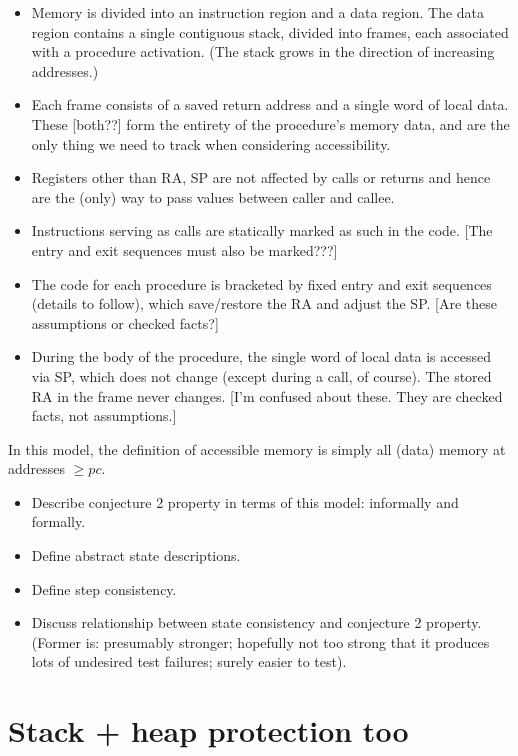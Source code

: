 \documentclass[conference]{IEEEtran}
\begin{document}
  \begin {itemize}
  \item Memory is divided into an instruction region and a data region. The data region contains a single contiguous stack, divided into frames, each associated with a procedure activation. (The stack grows in the direction of increasing addresses.)
  \item Each frame consists of a saved return address and a single word of local data. These [both??] form the entirety of the procedure's memory data, and are the only thing we need to track when considering accessibility.
  \item Registers other than RA, SP are not affected by calls or returns and hence are the (only) way to pass values between caller and callee.
  \item Instructions serving as calls are statically marked as such in the code. [The entry and exit sequences must also be marked???]
  \item The code for each procedure is bracketed by fixed entry and exit sequences (details to follow), which save/restore the RA and
    adjust the SP. [Are these assumptions or checked facts?]
  \item During the body of the procedure, the single word of local data is accessed via SP, which does not change (except during a call, of course).  The stored RA in the frame never changes. [I'm confused about these. They are checked facts, not assumptions.]
  \end {itemize}
  In this model, the definition of accessible memory is simply all (data) memory at addresses $\geq pc$.
\begin{itemize}
\item
  Describe conjecture 2 property in terms of this model: informally and formally.
\item
  Define abstract state descriptions.
\item
  Define step consistency.
\item
  Discuss relationship between state consistency and conjecture 2 property.  (Former is: presumably stronger; hopefully not
  too strong that it produces lots of undesired test failures; surely easier to test).

\end{itemize}







\iftext
\section{Stack + heap protection too}
\end{document}
